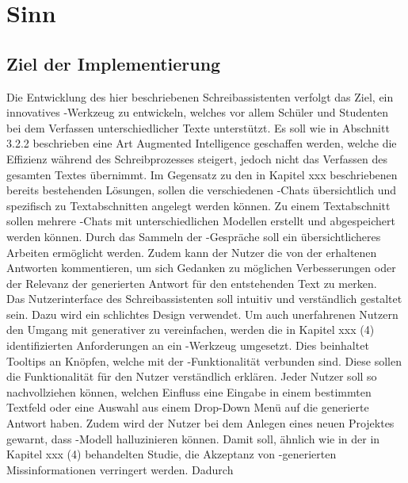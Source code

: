 \documentclass[../main.tex]{subfiles}
\begin{document}
\section{Sinn}

\subsection{Ziel der Implementierung}

Die Entwicklung des hier beschriebenen Schreibassistenten verfolgt das Ziel, ein innovatives -Werkzeug zu entwickeln, welches vor allem Schüler und Studenten bei dem Verfassen 
unterschiedlicher Texte unterstützt. Es soll wie in Abschnitt 3.2.2 beschrieben eine Art Augmented Intelligence geschaffen werden, welche die Effizienz während des Schreibprozesses 
steigert, jedoch nicht das Verfassen des gesamten Textes übernimmt. Im Gegensatz zu den in Kapitel xxx beschriebenen bereits bestehenden Lösungen, sollen die verschiedenen -Chats 
übersichtlich und spezifisch zu Textabschnitten angelegt werden können. Zu einem Textabschnitt sollen mehrere -Chats mit unterschiedlichen Modellen erstellt und abgespeichert 
werden können. Durch das Sammeln der -Gespräche soll ein übersichtlicheres Arbeiten ermöglicht werden. Zudem kann der Nutzer die von der  erhaltenen Antworten kommentieren, um 
sich Gedanken zu möglichen Verbesserungen oder der Relevanz der generierten Antwort für den entstehenden Text zu merken.\\
Das Nutzerinterface des Schreibassistenten soll intuitiv und verständlich gestaltet sein. Dazu wird ein schlichtes Design verwendet. Um auch unerfahrenen Nutzern den Umgang mit 
generativer  zu vereinfachen, werden die in Kapitel xxx (4) identifizierten Anforderungen an ein -Werkzeug umgesetzt. Dies beinhaltet Tooltips an Knöpfen, welche mit der 
-Funktionalität verbunden sind. Diese sollen die Funktionalität für den Nutzer verständlich erklären. Jeder Nutzer soll so nachvollziehen können, welchen Einfluss eine Eingabe in 
einem bestimmten Textfeld oder eine Auswahl aus einem Drop-Down Menü auf die generierte Antwort haben. Zudem wird der Nutzer bei dem Anlegen eines neuen Projektes gewarnt, dass 
-Modell halluzinieren können. Damit soll, ähnlich wie in der in Kapitel xxx (4) behandelten Studie, die Akzeptanz von -generierten Missinformationen verringert werden. Dadurch 
\end{document}
